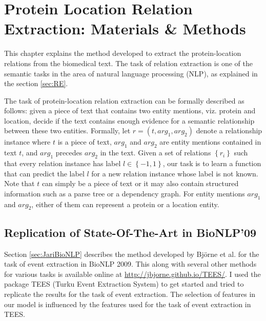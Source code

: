 \chapter{Protein Location Relation Extraction: Materials \& Methods}\label{chapter:methods}
\newcommand*{\xml}[1]{\texttt{<#1>}}

This chapter explains the method developed to extract the protein-location relations from the biomedical text. The task of relation extraction is one of the semantic tasks in the area of natural language processing (NLP), as explained in the section \ref{sec:RE}.

The task of protein-location relation extraction can be formally described as follows: given a piece of text that contains two entity mentions, viz. protein and location, decide if the text contains enough evidence for a semantic relationship between these two entities. Formally, let $r=(t,arg_1,arg_2)$ denote a relationship instance where $t$ is a piece of text, $arg_1$ and $arg_2$ are entity mentions contained in text $t$, and $arg_1$ precedes $arg_2$ in the text. Given a set of relations $\left\lbrace r_i \right\rbrace$ such that every relation instance has label $l \in \left\lbrace-1,1\right\rbrace$, our task is to learn a function that can predict the label $l$ for a new relation instance whose label is not known. Note that $t$ can simply be a piece of text or it may also contain structured information such as a parse tree or a dependency graph. For entity mentions $arg_1$ and $arg_2$, either of them can represent a protein or a location entity.

\section{Replication of State-Of-The-Art in BioNLP'09}

Section \ref{sec:JariBioNLP} describes the method developed by Björne et al. \cite{bjorne2009extracting} for the task of event extraction in BioNLP 2009. This along with several other methods for various tasks is available online at \url{http://jbjorne.github.io/TEES/}. I used the package TEES (Turku Event Extraction System) \cite{teesonline} to get started and tried to replicate the results for the task of event extraction. The selection of features in our model is influenced by the features used for the task of event extraction in TEES.

